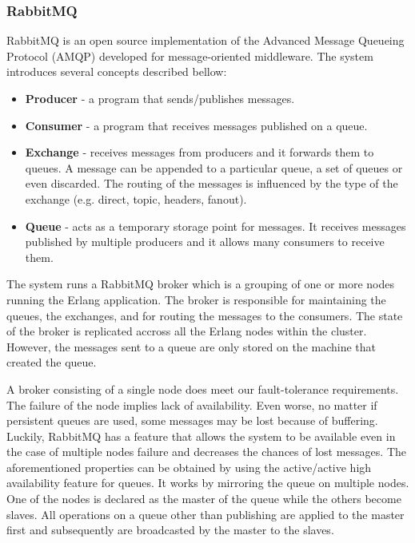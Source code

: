 \documentclass[11pt,a4paper,twoside]{report}
\begin{document}
\subsubsection{RabbitMQ}
RabbitMQ is an open source implementation of the Advanced Message Queueing Protocol (AMQP) developed for message-oriented middleware. The system introduces several concepts described bellow:

\begin{itemize}
\item{}
\textbf{Producer} - a program that sends/publishes messages.
\item{}
\textbf{Consumer} - a program that receives messages published on a queue.
\item{}
\textbf{Exchange} - receives messages from producers and it forwards them to queues. A message can be appended to a particular queue, a set of queues or even discarded. The routing of the messages is influenced by the type of the exchange (e.g. direct, topic, headers, fanout).
\item{}
\textbf{Queue} - acts as a temporary storage point for messages. It receives messages published by multiple producers and it allows many consumers to receive them.
\end{itemize}

The system runs a RabbitMQ broker which is a grouping of one or more nodes running the Erlang application. The broker is responsible for maintaining the queues, the exchanges, and for routing the messages to the consumers. The state of the broker is replicated accross all the Erlang nodes within the cluster. However, the messages sent to a queue are only stored on the machine that created the queue.


A broker consisting of a single node does meet our fault-tolerance requirements. The failure of the node implies lack of availability. Even worse, no matter if persistent queues are used, some messages may be lost because of buffering. Luckily, RabbitMQ has a feature that allows the system to be available even in the case of multiple nodes failure and decreases the chances of lost messages. The aforementioned properties can be obtained by using the active/active high availability feature for queues. It works by mirroring the queue on multiple nodes. One of the nodes is declared as the master of the queue while the others become slaves. All operations on a queue other than publishing are applied to the master first and subsequently are broadcasted by the master to the slaves.
\end{document}
